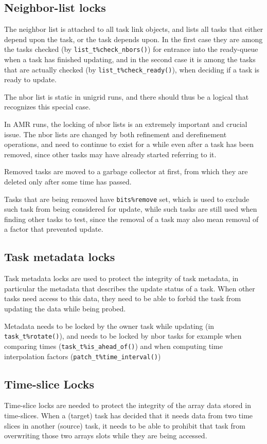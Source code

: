 \documentclass[paper=a4,fontsize=11pt]{scrartcl}
\numberwithin{equation}{section}		%
\numberwithin{figure}{section}			%
\numberwithin{table}{section}				%
\newcommand{\codecolor}{\color{Blue}}
\newcommand{\Code}[1]{{\codecolor\texttt{#1}}}
\begin{document}
\subsection{Neighbor-list locks}
The neighbor list is attached to all task link objects, and lists all tasks that either depend upon the task, or the task depends upon.  In the first case they are among the tasks checked (by \Code{list\_t\%check\_nbors()}) for entrance into the ready-queue when a task has finished updating, and in the second case it is among the tasks that are actually checked (by \Code{list\_t\%check\_ready()}), when deciding if a task is ready to update.

The nbor list is static in unigrid runs, and there should thus be a logical that recognizes this special case.

In AMR runs, the locking of nbor lists is an extremely important and crucial issue.  The nbor lists are changed by both refinement and derefinement operations, and need to continue to exist for a while even after a task has been removed, since other tasks may have already started referring to it.

Removed tasks are moved to a garbage collector at first, from which they are deleted only after some time has passed.  

Tasks that are being removed have \Code{bits\%remove} set, which is used to exclude such task from being considered for update, while such tasks are still used when finding other tasks to test, since the removal of a task may also mean removal of a factor that prevented update.

\subsection{Task metadata locks}
Task metadata locks are used to protect the integrity of task metadata, in particular the metadata that describes the update status of a task.  When other tasks need access to this data, they need to be able to forbid the task from updating the data while being probed.

Metadata needs to be locked by the owner task while updating (in \Code{task\_t\%rotate()}), and needs to be locked by nbor tasks for example when comparing times (\Code{task\_t\%is\_ahead\_of()}) and when computing time interpolation factors (\Code{patch\_t\%time\_interval()})

\subsection{Time-slice Locks}
Time-slice locks are needed to protect the integrity of the array data stored in time-slices.  When a (target) task has decided that it needs data from two time slices in another (source) task, it needs to be able to prohibit that task from overwriting those two arrays slots while they are being accessed.
\end{document}
